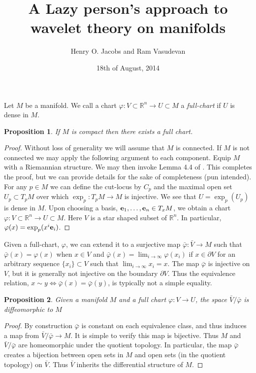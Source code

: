 \documentclass[12pt]{amsart}
\title{A Lazy person's approach to wavelet theory on manifolds}
\author{Henry O. Jacobs and Ram Vasudevan}
\date{18th of August, 2014}
\newtheorem{prop}{Proposition}
\begin{document}
\maketitle

Let $M$ be a manifold.
We call a chart $\varphi:V \subset \mathbb{R}^n \to U \subset M$ a
\emph{full-chart} if $U$ is dense in $M$.


\begin{prop}
If $M$ is compact then there exists a full chart.
\end{prop}
\begin{proof}
Without loss of generality we will assume that $M$ is connected.
If $M$ is not connected we may apply the following argument to each component.
Equip $M$ with a Riemannian structure.
We may then invoke Lemma 4.4 of \cite{Sakai1996}.
This completes the proof, but we can provide details for the sake of 
completeness (pun intended).
For any $p \in M$ we can define the cut-locus by $C_p$ and the maximal open set $U_p \subset T_p M$ over which $\exp_p : T_p M \to M$ is injective.
We see that $U = \exp_p(U_p)$ is dense in $M$.
Upon choosing a basis, ${\bf e}_1,\dots,{\bf e}_n \in T_xM$,
 we obtain a chart $\varphi: V \subset \mathbb{R}^n \to U \subset M$.
Here $V$ is a star shaped subset of $\mathbb{R}^n$.
In particular, $\varphi(x) = \exp_p ( x^i {\bf e}_i )$.
\end{proof}

Given a full-chart, $\varphi$, we can extend it to a surjective map $\bar{\varphi} : \bar{V} \to M$
such that $\bar{\varphi}(x) = \varphi(x)$ when $x \in V$ and $\bar{\varphi}(x) = \lim_{i \to \infty} \varphi(x_i)$ if $x \in \partial V$ for an arbitrary sequence $\{ x_i \} \subset V$ such that $\lim_{i \to \infty} x_i = x$.
The map $\bar{\varphi}$ is injective on $V$, but it is generally not injective on the boundary $\partial V$.
Thus the equivalence relation,
 $x \sim y \iff \bar{\varphi}(x) = \bar{\varphi}(y)$,
 is typically not a simple equality.

\begin{prop} \label{prop:manifold}
  Given a manifold $M$ and a full chart $\varphi:V \to U$, the space $\bar{V} / \bar{\varphi}$ is diffeomorphic to $M$
\end{prop}
\begin{proof}
  By construction $\bar{\varphi}$ is constant on each equivalence class,
and thus induces a map from $\bar{V} /\bar{\varphi} \to M$.
It is simple to verify this map is bijective.
Thus $M$ and $\bar{V} / \bar{\varphi}$ are homeomorphic under the quotient topology.
  In particular, the map $\bar{\varphi}$ creates a bijection between open sets in $M$ and open sets (in the quotient topology) on $\bar{V}$.
  Thus $\bar{V}$ inherits the differential structure of $M$.
\end{proof}
\end{document}
